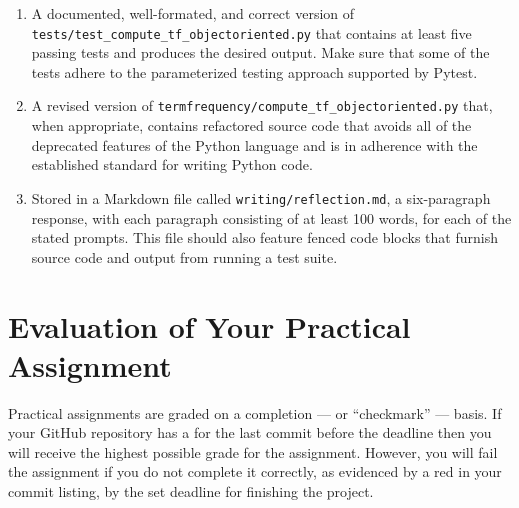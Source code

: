 \documentclass[11pt]{article}
\newcommand{\mainprogramsource}{\lstinline{termfrequency/compute_tf_objectoriented.py}}
\newcommand{\testprogramsource}{\lstinline{tests/test_compute_tf_objectoriented.py}}
\newcommand{\reflection}{\lstinline{writing/reflection.md}}
\newcommand{\checkmark}{\ding{51}}
\newcommand{\naughtmark}{\ding{55}}
\begin{document}
\vspace*{-.25em}

\begin{enumerate}

\setlength{\itemsep}{0in}

\item A documented, well-formated, and correct version of \testprogramsource{}
  that contains at least five passing tests and produces the desired output.
  Make sure that some of the tests adhere to the parameterized testing approach
  supported by Pytest.

\item A revised version of \mainprogramsource{} that, when appropriate, contains
  refactored source code that avoids all of the deprecated features of the
  Python language and is in adherence with the established standard for writing
  Python code.

\item Stored in a Markdown file called \reflection{}, a six-paragraph response,
  with each paragraph consisting of at least 100 words, for each of the stated
  prompts. This file should also feature fenced code blocks that furnish source
  code and output from running a test suite.

\end{enumerate}

\vspace*{-1em}

\section*{Evaluation of Your Practical Assignment}

Practical assignments are graded on a completion --- or ``checkmark'' --- basis.
If your GitHub repository has a \checkmark{} for the last commit before the
deadline then you will receive the highest possible grade for the assignment.
However, you will fail the assignment if you do not complete it correctly, as
evidenced by a red \naughtmark{} in your commit listing, by the set deadline for
finishing the project.

\end{document}
